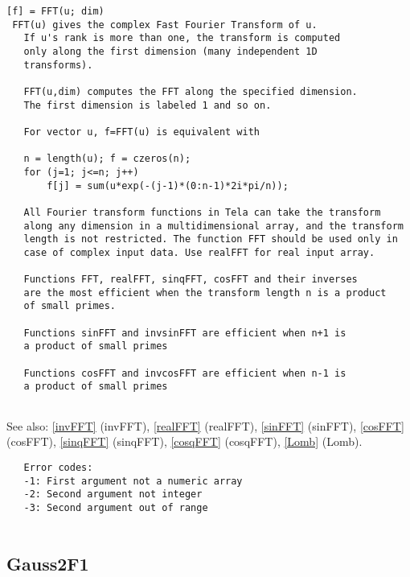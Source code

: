 \documentclass[a4paper]{article}
\begin{document}
\begin{tscreen}
\begin{verbatim}
[f] = FFT(u; dim)
 FFT(u) gives the complex Fast Fourier Transform of u.
   If u's rank is more than one, the transform is computed
   only along the first dimension (many independent 1D
   transforms).

   FFT(u,dim) computes the FFT along the specified dimension.
   The first dimension is labeled 1 and so on.

   For vector u, f=FFT(u) is equivalent with

   n = length(u); f = czeros(n);
   for (j=1; j<=n; j++)
       f[j] = sum(u*exp(-(j-1)*(0:n-1)*2i*pi/n));

   All Fourier transform functions in Tela can take the transform
   along any dimension in a multidimensional array, and the transform
   length is not restricted. The function FFT should be used only in
   case of complex input data. Use realFFT for real input array.

   Functions FFT, realFFT, sinqFFT, cosFFT and their inverses
   are the most efficient when the transform length n is a product
   of small primes.

   Functions sinFFT and invsinFFT are efficient when n+1 is
   a product of small primes
           
   Functions cosFFT and invcosFFT are efficient when n-1 is
   a product of small primes
           
\end{verbatim}

See also: \ref{invFFT} {(invFFT)}, \ref{realFFT} {(realFFT)}, \ref{sinFFT} {(sinFFT)}, \ref{cosFFT} {(cosFFT)}, \ref{sinqFFT} {(sinqFFT)}, \ref{cosqFFT} {(cosqFFT)}, \ref{Lomb} {(Lomb)}.
\begin{verbatim}
   Error codes:
   -1: First argument not a numeric array
   -2: Second argument not integer
   -3: Second argument out of range
   
\end{verbatim}
\end{tscreen}





\subsection{Gauss2F1\label{Gauss2F1}}
\end{document}
